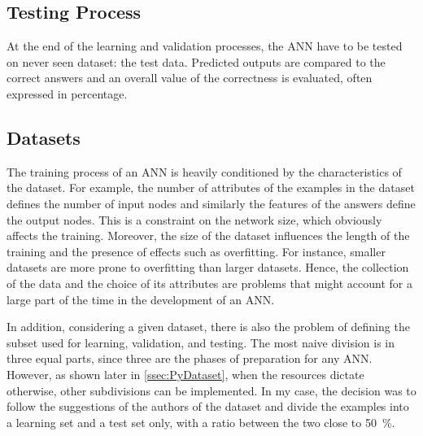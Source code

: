 \subsection{Testing Process}
\label{ssec:Testing_Process}
At the end of the learning and validation processes, the ANN have to be tested on never seen dataset: the test data.
Predicted outputs are compared to the correct answers and an overall value of the correctness is evaluated, often expressed in percentage.

\subsection{Datasets}
\label{ssec:Datasets}
The training process of an \acs{ANN} is heavily conditioned by the characteristics of the dataset.
For example, the number of attributes of the examples in the dataset defines the number of input nodes and similarly the features of the answers define the output nodes.
This is a constraint on the network size, which obviously affects the training.
Moreover, the size of the dataset influences the length of the training and the presence of effects such as overfitting.
For instance, smaller datasets are more prone to overfitting than larger datasets.
Hence, the collection of the data and the choice of its attributes are problems that might account for a large part of the time in the development of an \acs{ANN}.

In addition, considering a given dataset, there is also the problem of defining the subset used for learning, validation, and testing.
The most naive division is in three equal parts, since three are the phases of preparation for any \acs{ANN}.
However, as shown later in \autoref{ssec:PyDataset}, when the resources dictate otherwise, other subdivisions can be implemented.
In my case, the decision was to follow the suggestions of the authors of the dataset and divide the examples into a learning set and a test set only, with a ratio between the two close to \SI{50}{\percent}.

%

